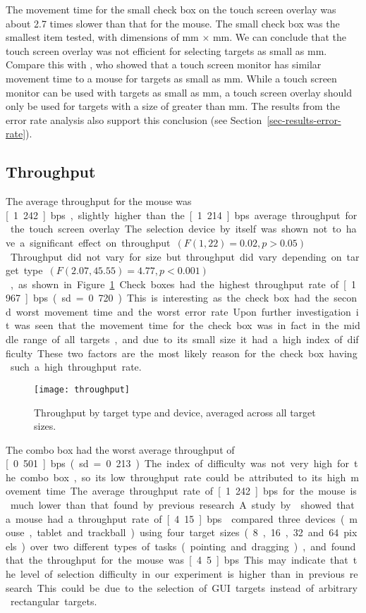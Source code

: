 \documentclass{elsart}
\begin{document}
The movement time for the small check box on the touch screen overlay
was about 2.7 times slower than that for the mouse. The small check box
was the smallest item tested, with dimensions of \unit[4]{mm} \(\times\)
\unit[4]{mm}. We can conclude that the touch screen overlay was not
efficient for selecting targets as small as \unit[4]{mm}. Compare this
with \citet{Sear-A-1991-IJMMS}, who showed that a touch screen monitor
has similar movement time to a mouse for targets as small as
\unit[2]{mm}. While a touch screen monitor can be used with targets as
small as \unit[2]{mm}, a touch screen overlay should only be used for
targets with a size of greater than \unit[4]{mm}. The results from the
error rate analysis also support this conclusion (see
Section~\ref{sec-results-error-rate}).


\subsection{Throughput}
\label{sec-results-throughput}

The average throughput for the mouse was \unit[1.242]{bps}, slightly
higher than the \unit[1.214]{bps} average throughput for the touch
screen overlay. The selection device by itself was shown not to have a
significant effect on throughput \((F(1, 22) = 0.02, p > 0.05)\).
Throughput did not vary for size but throughput did vary depending on
target type \((F(2.07, 45.55) = 4.77, p < 0.001)\), as shown in
Figure~\ref{fig-throughput}. Check boxes had the highest throughput rate
of \unit[1.967]{bps} (sd = 0.720). This is interesting as the check box
had the second worst movement time and the worst error rate. Upon
further investigation it was seen that the movement time for the check
box was in fact in the middle range of all targets, and due to its small
size it had a high index of difficulty. These two factors are the most
likely reason for the check box having such a high throughput rate.


\begin{figure}
	\centering
	\texttt{[image: throughput]}
	\caption{Throughput by target type and device, averaged across all
	target sizes.}
	\label{fig-throughput}
\end{figure}


The combo box had the worst average throughput of \unit[0.501]{bps} (sd
= 0.213). The index of difficulty was not very high for the combo box,
so its low throughput rate could be attributed to its high movement
time.

The average throughput rate of \unit[1.242]{bps} for the mouse is much
lower than that found by previous research. A study by
\citet{Doug-SA-1994-SIGCHI} showed that a mouse had a throughput rate of
\unit[4.15]{bps}. \citet{Mack-IS-1991} compared three devices (mouse,
tablet and trackball) using four target sizes (8, 16, 32 and 64 pixels)
over two different types of tasks (pointing and dragging), and found
that the throughput for the mouse was \unit[4.5]{bps}. This may indicate
that the level of selection difficulty in our experiment is higher than
in previous research. This could be due to the selection of GUI targets
instead of arbitrary rectangular targets.
\end{document}
